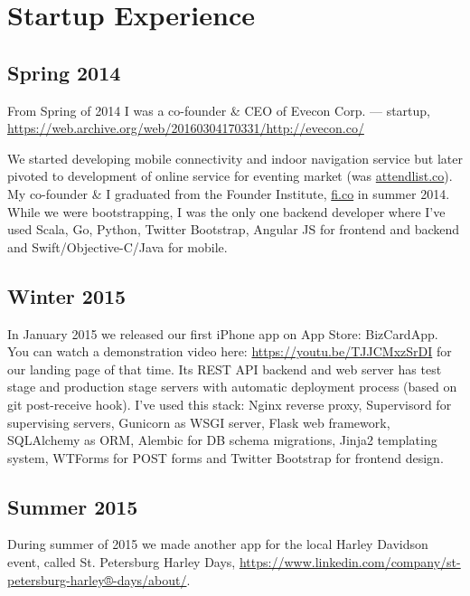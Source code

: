 \section*{Startup Experience}

\subsection*{Spring 2014}

From Spring of 2014 I was a co-founder \& CEO of Evecon Corp. ---
startup,
\href{https://web.archive.org/web/20160304170331/http://evecon.co/}{\url{https://web.archive.org/web/20160304170331/http://evecon.co/}}

We started developing mobile connectivity and indoor navigation
service but later pivoted to development of online service for
eventing market (was \url{attendlist.co}). My co-founder \& I
graduated from the Founder Institute,
\href{https://fi.co}{\url{fi.co}} in summer 2014. While we were
bootstrapping, I was the only one backend developer where I've used
Scala, Go, Python, Twitter Bootstrap, Angular JS for frontend and
backend and Swift/Objective-C/Java for mobile.

\subsection*{Winter 2015}

In January 2015 we released our first iPhone app on App Store:
BizCardApp. You can watch a demonstration video here:
\href{https://youtu.be/TJJCMxzSrDI}{\url{https://youtu.be/TJJCMxzSrDI}}
for our landing page of that time. Its REST API backend and web server
has test stage and production stage servers with automatic deployment
process (based on git post-receive hook). I've used this stack: Nginx
reverse proxy, Supervisord for supervising servers, Gunicorn as WSGI
server, Flask web framework, SQLAlchemy as ORM, Alembic for DB schema
migrations, Jinja2 templating system, WTForms for POST forms and
Twitter Bootstrap for frontend design.

\subsection*{Summer 2015}

During summer of 2015 we made another app for the local Harley
Davidson event, called St. Petersburg Harley Days,
\href{https://www.linkedin.com/company/st-petersburg-harley®-days/about/}{\url{https://www.linkedin.com/company/st-petersburg-harley®-days/about/}}.

